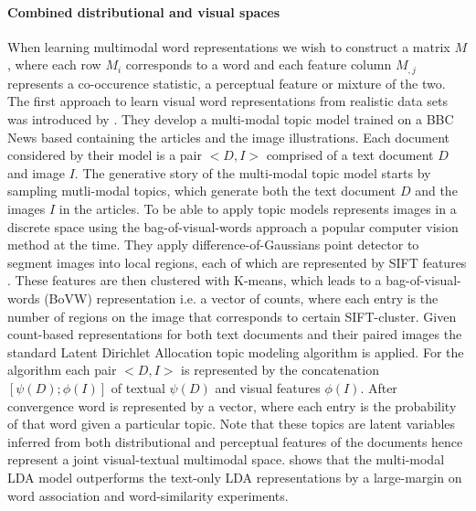 \paragraph{Combined distributional and visual spaces}
When learning multimodal word representations we wish to construct a matrix $M$, where each row $M_i$
corresponds to a word and each feature column $M_{,j}$ represents a co-occurence statistic,
a perceptual feature or mixture of the two.
The first approach to learn visual word representations from realistic data sets
was introduced by \cite{feng2010visual}. They develop a multi-modal topic model trained on a
BBC News based containing the articles and the image illustrations. Each document considered by their model
is a pair $<D, I>$ comprised of a text document $D$ and image $I$.
The generative story of the multi-modal topic model starts by sampling mutli-modal topics,
which generate both the text document $D$ and the images $I$ in the articles.
To be able to apply topic models \cite{feng2010visual} represents images
in a discrete space using the bag-of-visual-words approach \cite{csurka2004visual}
a popular computer vision method at the time. They apply difference-of-Gaussians point detector to segment images
into local regions, each of which are represented by SIFT features \cite{lowe1999object}.
These features are then clustered with K-means, which leads to a bag-of-visual-words (BoVW) representation i.e.
a vector of counts, where each entry is the number of regions on the image that corresponds to certain SIFT-cluster.
Given count-based representations for both text documents and their paired images the standard
Latent Dirichlet Allocation topic modeling algorithm is applied. For the algorithm each
pair $<D, I>$ is represented by the concatenation $[\psi(D);\phi(I)]$ of textual
$\psi(D)$ and visual features $\phi(I)$. After convergence word is represented by a vector,
 where each entry is the probability of that word given a particular topic.
Note that these topics are latent variables inferred from
both distributional and perceptual features of the documents hence represent a joint
visual-textual multimodal space. \cite{feng2010visual}
shows that the multi-modal LDA model outperforms the text-only LDA representations by a
large-margin on word association and word-similarity experiments.

